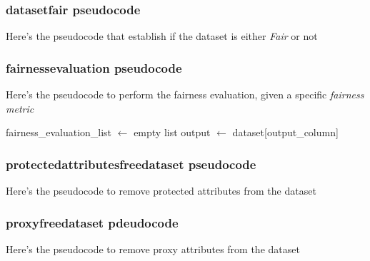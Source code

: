 \documentclass[12pt,a4paper,openright,twoside]{book}
\begin{document}
\subsubsection{dataset\textunderscore fair pseudocode}
Here's the pseudocode that establish if the dataset is either \emph{Fair} or not

\begin{algorithm}[H]
\end{algorithm}

\subsubsection{fairness\textunderscore evaluation pseudocode}
Here's the pseudocode to perform the fairness evaluation, given a specific \emph{fairness metric}

\begin{algorithm}[H]
    fairness\_evaluation\_list $\gets$ empty list\;
    output $\gets$ dataset[output\_column]\;
\end{algorithm}

\subsubsection{protected\textunderscore attributes\textunderscore free\textunderscore dataset pseudocode}
Here's the pseudocode to remove protected attributes from the dataset

\begin{algorithm}[H]
\end{algorithm}

\subsubsection{proxy\textunderscore free\textunderscore dataset pdeudocode}
Here's the pseudocode to remove proxy attributes from the dataset
\end{document}
